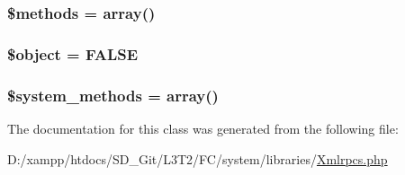 \subsubsection[{\$methods}]{\setlength{\rightskip}{0pt plus 5cm}\$methods = array()}\label{class_c_i___xmlrpcs_a802753499268a04da139bd6e6ef89b35}
\hypertarget{class_c_i___xmlrpcs_a52123b83a1952a68c5513e47d59ec4a6}{}
\subsubsection[{\$object}]{\setlength{\rightskip}{0pt plus 5cm}\$object = F\+A\+L\+S\+E}\label{class_c_i___xmlrpcs_a52123b83a1952a68c5513e47d59ec4a6}
\hypertarget{class_c_i___xmlrpcs_a07c837152d76c5e72b0bd7a065fa9c10}{}
\subsubsection[{\$system\+\_\+methods}]{\setlength{\rightskip}{0pt plus 5cm}\$system\+\_\+methods = array()}\label{class_c_i___xmlrpcs_a07c837152d76c5e72b0bd7a065fa9c10}


The documentation for this class was generated from the following file\+:\begin{DoxyCompactItemize}
\item 
D\+:/xampp/htdocs/\+S\+D\+\_\+\+Git/\+L3\+T2/\+F\+C/system/libraries/\hyperlink{_xmlrpcs_8php}{Xmlrpcs.\+php}\end{DoxyCompactItemize}
